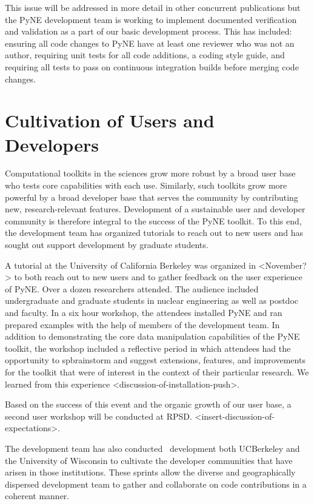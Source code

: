 \documentclass{anstrans}
\begin{document}
This issue will be addressed in more detail in other concurrent publications 
but the PyNE development team is working to implement documented verification 
and validation as a part of our basic development process. This has included: 
ensuring all code changes to PyNE have at least one reviewer who was not an 
author, requiring unit tests for all code additions, a coding style guide, 
and requiring all tests to pass on continuous integration builds before 
merging code changes. 


\section{Cultivation of Users and Developers} 
Computational toolkits in the sciences grow more robust by a broad user base who tests core capabilities with each use. Similarly, such toolkits grow more powerful by a broad developer base that serves the community by contributing new, research-relevant features. Development of a sustainable user and developer community is therefore integral to the success of the PyNE toolkit. To this end, the development team has organized tutorials to reach out to new users and has sought out support development by graduate students.

A tutorial at the University of California Berkeley was organized in <November?> to both reach out to new users and to gather feedback on the user experience of PyNE. Over a dozen researchers attended. The audience included undergraduate and graduate students in nuclear engineering as well as postdoc and faculty. In a six hour workshop, the attendees installed PyNE and ran prepared examples with the help of members of the development team. In addition to demonstrating the core data manipulation capabilities of the PyNE toolkit, the workshop included a reflective period in which attendees had the opportunity to spbrainstorm and suggest extensions, features, and improvements for the toolkit that were of interest in the context of their particular research. We learned from this experience <discussion-of-installation-push>.

Based on the success of this event and the organic growth of our user base, a second user workshop will be conducted at RPSD. <insert-discussion-of-expectations>.

The development team has also conducted  development both UCBerkeley and the University of Wisconsin to cultivate the developer communities that have arisen in those institutions. These sprints allow the diverse and geographically dispersed development team to gather and collaborate on code contributions in a coherent manner.
\end{document}
